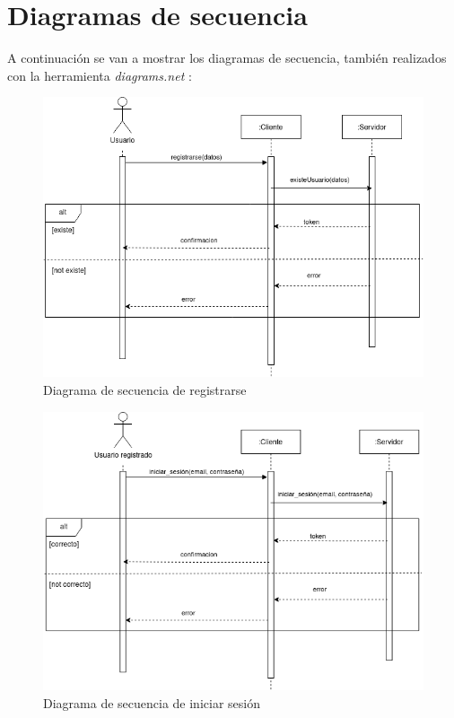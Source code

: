 \newpage
\section{Diagramas de secuencia}
A continuación se van a mostrar los diagramas de secuencia, también realizados
con la herramienta \textit{diagrams.net} \cite{diagramsnet}:

\begin{figure}[h]
    \centering
    \includegraphics[width=\textwidth]{diagramas/secuencia_registrarse.png}
    \caption{Diagrama de secuencia de registrarse}
    \label{fig:registrarse}
\end{figure}

\begin{figure}[h]
    \centering
    \includegraphics[width=\textwidth]{diagramas/secuencia_iniciar_sesion.png}
    \caption{Diagrama de secuencia de iniciar sesión}
    \label{fig:iniciar_sesion}
\end{figure}

